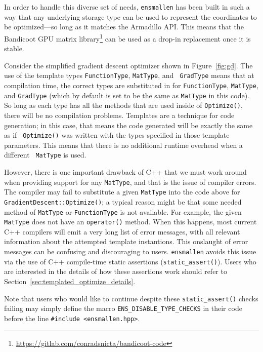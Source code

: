 In order to handle this diverse set of needs, {\tt ensmallen} has been built in
such a way that any underlying storage type can be used to represent the
coordinates to be optimized---so long as it matches the Armadillo API.
This means that the Bandicoot GPU matrix library\footnote{\url{https://gitlab.com/conradsnicta/bandicoot-code}}
can be used as a drop-in replacement once it is stable.

Consider the simplified gradient descent optimizer shown in Figure~\ref{fig:gd}.
The use of the template types {\tt FunctionType}, {\tt MatType}, and {\tt
GradType} means that at compilation time, the correct types are substituted in
for {\tt FunctionType}, {\tt MatType}, and {\tt GradType} (which by default is
set to be the same as {\tt MatType} in this code).  So long as each type has all
the methods that are used inside of {\tt Optimize()}, there will be no
compilation problems.  Templates are a technique for code generation; in this
case, that means the code generated will be exactly the same as if {\tt
Optimize()} was written with the types specified in those template parameters.
This means that there is no additional runtime overhead when a different {\tt
MatType} is used.


However, there is one important drawback of C++ that we must work around when
providing support for any {\tt MatType}, and that is the issue of compiler
errors.  The compiler may fail to substitute a given {\tt MatType} into the
code above for {\tt GradientDescent::Optimize()}; a typical reason might be that
some needed method of {\tt MatType} or {\tt FunctionType} is not available.
For example, the given {\tt MatType} does not have an {\tt operator\*()} method.
When this happens, most current C++ compilers will emit a very long list
of error messages, with all relevant information about the attempted
template instantions.
This onslaught of error messages can be confusing and discouraging to users.
{\tt ensmallen} avoids this issue via the use of C++ compile-time static
assertions ({\tt static\_assert()}).
Users who are interested in the details of how these assertions work should
refer to Section~\ref{sec:templated_optimize_details}.

Note that users who would like to continue despite these {\tt static\_assert()}
checks failing may simply define the macro {\tt ENS\_DISABLE\_TYPE\_CHECKS} in
their code before the line {\tt \#include <ensmallen.hpp>}.
